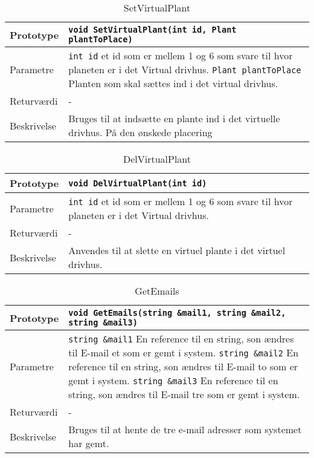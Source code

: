 \begin{table}[ht]
\begin{tabularx}{\textwidth}{| L{2.5 cm} | Z |} \hline
Prototype & \texttt{void SetVirtualPlant(int id, Plant plantToPlace)} \\\hline
Parametre & \texttt{int id} \newline et id som er mellem 1 og 6 som svare til hvor planeten er i det Virtual drivhus. \newline
\texttt{Plant plantToPlace} \newline Planten som skal sættes ind i det virtual drivhus. \\\hline
Returværdi & - \\\hline
Beskrivelse & Bruges til at indsætte en plante ind i det virtuelle drivhus. På den ønskede placering \\\hline
\end{tabularx}
\caption{SetVirtualPlant}
\label{table:Indstillinger_SetVirtualPlant}
\end{table}

\begin{table}[ht]
\begin{tabularx}{\textwidth}{| L{2.5 cm} | Z |} \hline
Prototype & \texttt{void DelVirtualPlant(int id)} \\\hline
Parametre & \texttt{int id} \newline et id som er mellem 1 og 6 som svare til hvor planeten er i det Virtual drivhus. \\\hline
Returværdi & - \\\hline
Beskrivelse & Anvendes til at slette en virtuel plante i det virtuel drivhus. \\\hline
\end{tabularx}
\caption{DelVirtualPlant}
\label{table:Indstillinger_DelVirtualPlant}
\end{table}

\begin{table}[ht]
\begin{tabularx}{\textwidth}{| L{2.5 cm} | Z |} \hline
Prototype & \texttt{void GetEmails(string \&mail1, string \&mail2, string \&mail3)} \\\hline
Parametre & \texttt{string \&mail1} \newline En reference til en string, son ændres til E-mail et som er gemt i system. \newline
\texttt{string \&mail2} \newline En reference til en string, son ændres til E-mail to som er gemt i system.
\newline
\texttt{string \&mail3} \newline En reference til en string, son ændres til E-mail tre som er gemt i system.
 \\\hline
Returværdi & - \\\hline
Beskrivelse & Bruges til at hente de tre e-mail adresser som systemet har gemt. \\\hline
\end{tabularx}
\caption{GetEmails}
\label{table:Indstillinger_GetEmails}
\end{table}

